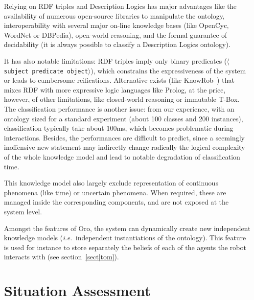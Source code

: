 \documentclass[letterpaper, 10 pt, conference]{ieeeconf}  %
\newcommand{\stmt}[1]{{\footnotesize \tt $\langle$ #1\relax$\rangle$}}
\newcommand{\ie}{{\textit{i.e.\ }}}
\begin{document}
Relying on RDF triples and Description Logics has major advantages like the
availability of numerous open-source libraries to manipulate the ontology,
interoperability with several major on-line knowledge bases (like {\sc
OpenCyc}, {\sc WordNet} or {\sc DBPedia}), open-world reasoning, and the formal
guarantee of decidability (it is always possible to classify a Description
Logics ontology).

It has also notable limitations: RDF triples imply only binary predicates
(\stmt{subject predicate object}), which constrains the expressiveness of the
system or leads to cumbersome reifications. Alternative exists (like {\sc
KnowRob}~\cite{Tenorth2009a}) that mixes RDF with more expressive logic
languages like {\sc Prolog}, at the price, however, of other limitations, like
closed-world reasoning or immutable T-Box. The classification
performance is another issue: from our experience, with an ontology sized for a
standard experiment (about 100 classes and 200 instances), classification
typically take about 100ms, which becomes problematic during interactions.
Besides, the performances are difficult to predict, since a seemingly
inoffensive new statement may indirectly change radically the logical
complexity of the whole knowledge model and lead to notable degradation of
classification time.

This knowledge model also largely exclude representation of continuous
phenomena (like time) or uncertain phenomena. When required, these are managed
inside the corresponding components, and are not exposed at the system level.

Amongst the features of {\sc Oro}, the system can dynamically create
new independent knowledge models (\ie independent instantiations of the
ontology). This feature is used for instance to store separately the beliefs of
each of the agents the robot interacts with (see section~\ref{sect|tom}).


\section{Situation Assessment}
\label{sect|sit-ass}
\end{document}
